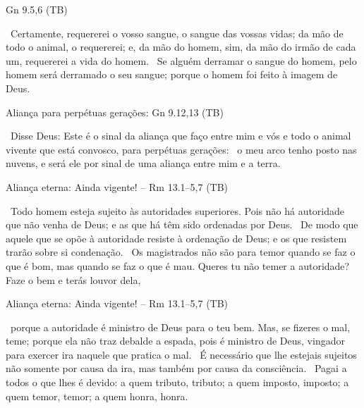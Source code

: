 \documentclass[12pt,aspectratio=169]{beamer}
\newcommand{\ver}[1]{%
    \raisebox{0.50ex}{%
        \scalebox{1.1}{%
            \pmb{\textbf{\textcolor{BSpbg}{#1}}}%
        }%
    }%
}
\newcommand{\QUOTE}[1]{%
    \par\noindent\hspace*{0.05\linewidth}%
    \begin{minipage}{0.9\linewidth}%
        \linespread{1.35}\large{#1}%
    \end{minipage}%
}
\newcommand{\RED}[1]{{\textcolor{TXred}{#1}}}
\newcommand{\ORA}[1]{{\textcolor{TXred!50!TXyel}{#1}}}
\newcommand{\YEL}[1]{{\textcolor{TXyel}{#1}}}
\newcommand{\GRE}[1]{{\textcolor{TXgre}{#1}}}
\newcommand{\CYA}[1]{{\textcolor{TXcya}{#1}}}
\newcommand{\MAG}[1]{{\textcolor{TXmag}{#1}}}
\newcommand{\BRI}[1]{{\textcolor{BSpbg}{#1}}}   %
\begin{document}
    \begin{frame}{Gn 9.5,6 (TB)}
        \QUOTE{%
            \ver{5}~\YEL{Certamente, requererei o vosso sangue}, o sangue das vossas vidas;
            \ORA{da mão de todo o animal, o requererei}; e, \RED{da mão do homem}, sim, da mão
            do irmão de cada um, requererei a vida do homem.
            \ver{6}~\YEL{Se alguém derramar o sangue do homem}, \GRE{pelo homem será derramado o
            seu sangue}; porque \CYA{o homem foi feito à imagem de Deus}.
        }
    \end{frame}

    \begin{frame}{Aliança para \BRI{perpétuas gerações}: Gn 9.12,13 (TB)}
        \QUOTE{%
            \ver{12}~Disse Deus: Este é o \YEL{sinal da aliança} que faço entre mim e vós e todo
            o animal vivente que está convosco, para \BRI{perpétuas gerações}:
            \ver{13}~\YEL{o meu arco} tenho posto nas nuvens, e será ele por sinal de uma
            \YEL{aliança entre mim e a terra}.
        }
    \end{frame}

    \begin{frame}{Aliança eterna: \BRI{Ainda vigente!} -- Rm 13.1--5,7 (TB)}
        \QUOTE{%
            \ver{1}~Todo homem esteja \YEL{sujeito} às autoridades superiores. Pois \YEL{não há
            autoridade que não venha de Deus}; e as que há têm sido \YEL{ordenadas por Deus}.
            \ver{2}~De modo que aquele que se \RED{opõe} à autoridade \RED{resiste à ordenação
            de Deus}; e os que resistem trarão sobre si \RED{condenação}.
            \ver{3}~Os magistrados não são para temor quando se faz o que é bom, mas quando se
            faz o que é mau. Queres tu não temer a autoridade? \YEL{Faze o bem} e terás louvor
            dela,
        }
    \end{frame}

    \begin{frame}{Aliança eterna: \BRI{Ainda vigente!} -- Rm 13.1--5,7 (TB)}
        \QUOTE{%
            \ver{4}~porque a autoridade é \YEL{ministro de Deus} para o teu bem. Mas, se fizeres
            o mal, teme; porque ela não traz debalde a \MAG{espada}, pois é \MAG{ministro de
            Deus, vingador} para exercer ira naquele que pratica o mal.
            \ver{5}~É necessário que \YEL{lhe estejais sujeitos} não somente por causa da ira,
            mas também por causa da \YEL{consciência}.
            \ver{7}~\YEL{Pagai a todos o que lhes é devido}: a quem tributo, \GRE{tributo}; a
            quem imposto, \GRE{imposto}; a quem temor, \GRE{temor}; a quem honra, \GRE{honra}.
        }
    \end{frame}
\end{document}
